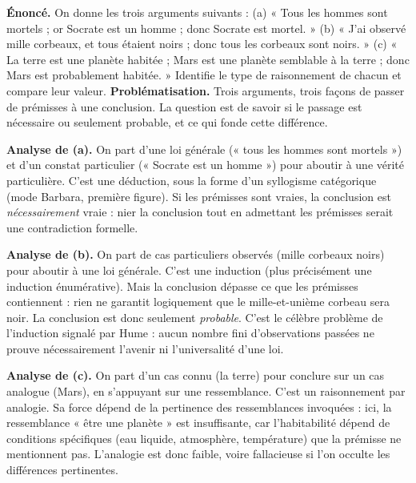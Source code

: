 \documentclass[11pt]{article}
\newcommand{\cle}[1]{{\popxbold\color{popdark}#1}}
\begin{document}
\begin{exoresolu}
\textbf{Énoncé.} On donne les trois arguments suivants : (a) « Tous les hommes sont mortels ; or Socrate est un homme ; donc Socrate est mortel. » (b) « J'ai observé mille corbeaux, et tous étaient noirs ; donc tous les corbeaux sont noirs. » (c) « La terre est une planète habitée ; Mars est une planète semblable à la terre ; donc Mars est probablement habitée. » Identifie le type de raisonnement de chacun et compare leur valeur.
\tcblower
\textbf{Problématisation.} Trois arguments, trois façons de passer de prémisses à une conclusion. La question est de savoir si le passage est nécessaire ou seulement probable, et ce qui fonde cette différence.

\textbf{Analyse de (a).} On part d'une loi générale (« tous les hommes sont mortels ») et d'un constat particulier (« Socrate est un homme ») pour aboutir à une vérité particulière. C'est une \cle{déduction}, sous la forme d'un syllogisme catégorique (mode Barbara, première figure). Si les prémisses sont vraies, la conclusion est \emph{nécessairement} vraie : nier la conclusion tout en admettant les prémisses serait une contradiction formelle.

\textbf{Analyse de (b).} On part de cas particuliers observés (mille corbeaux noirs) pour aboutir à une loi générale. C'est une \cle{induction} (plus précisément une induction énumérative). Mais la conclusion dépasse ce que les prémisses contiennent : rien ne garantit logiquement que le mille-et-unième corbeau sera noir. La conclusion est donc seulement \emph{probable}. C'est le célèbre problème de l'induction signalé par Hume : aucun nombre fini d'observations passées ne prouve nécessairement l'avenir ni l'universalité d'une loi.

\textbf{Analyse de (c).} On part d'un cas connu (la terre) pour conclure sur un cas analogue (Mars), en s'appuyant sur une ressemblance. C'est un raisonnement par \cle{analogie}. Sa force dépend de la pertinence des ressemblances invoquées : ici, la ressemblance « être une planète » est insuffisante, car l'habitabilité dépend de conditions spécifiques (eau liquide, atmosphère, température) que la prémisse ne mentionnent pas. L'analogie est donc faible, voire fallacieuse si l'on occulte les différences pertinentes.


\end{exoresolu}
\end{document}
